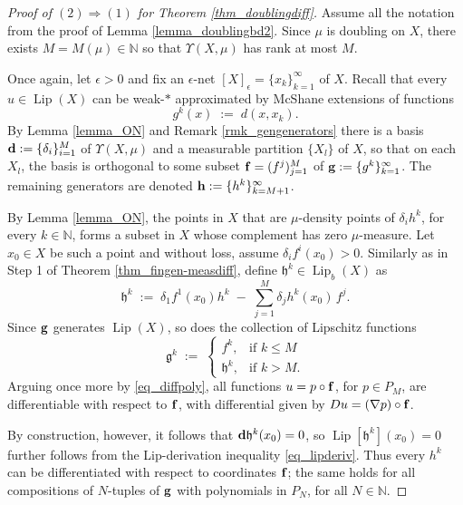 \documentclass[reqno]{amsart}
\theoremstyle{plain}
\theoremstyle{definition}
\theoremstyle{remark}
\numberwithin{equation}{section}
\renewcommand{\d}{\delta}
\newcommand{\e}{\epsilon}
\newcommand{\g}{\mathfrak{g}}
\newcommand{\h}{\mathfrak{h}}
\newcommand{\Lip}{\operatorname{Lip}}
\newcommand{\N}{\mathbb{N}}
\newcommand{\U}{\Upsilon}
\begin{document}
\begin{proof}[Proof of $(2) \Rightarrow (1)$ for Theorem \ref{thm_doublingdiff}]
Assume all the notation from the proof of Lemma \ref{lemma_doublingbd2}.  Since $\mu$ is doubling on $X$, there exists $M = M(\mu) \in \N$ so that $\U(X,\mu)$ has rank at most $M$.

Once again, let $\e > 0$ and fix an $\e$-net $[X]_\e = \{x_k\}_{k=1}^\infty$ of $X$.
Recall that every $u \in \Lip(X)$ can be weak-$*$ approximated by McShane extensions of functions
$$
g^k(x) \;:=\; d(x,x_k).
$$
By Lemma \ref{lemma_ON} and Remark \ref{rmk_gengenerators} there is a basis ${\bf d} := \{\d_i\}_{i=1}^M$ of $\U(X,\mu)$ and a measurable partition $\{X_l\}$ of $X$, so that on each $X_l$, the basis is orthogonal to some subset ${\bf f} = (f^j)_{j=1}^M$ of ${\bf g} := \{g^k\}_{k=1}^\infty$.  The remaining generators are denoted ${\bf h} := \{h^k\}_{k=M+1}^\infty$.

By Lemma \ref{lemma_ON}, the points in $X$ that are $\mu$-density points of $\d_ih^k$, for every $k \in \N$, 
forms a subset in $X$ whose complement has zero $\mu$-measure.
Let $x_0 \in X$ be such a point and without loss, assume $\d_if^i(x_0) > 0$.  Similarly as in Step 1 of Theorem \ref{thm_fingen-measdiff}, define $\h^k \in \Lip_b(X)$ as
$$
\h^k \;:=\; \d_1f^1(x_0) h^k \;-\; \sum_{j=1}^M \d_jh^k(x_0) \, f^j.
$$
Since ${\bf g}$ generates $\Lip(X)$, so does the collection of Lipschitz functions
$$
\g^k \;:=\;
\begin{cases}
f^k, & \text{if } k \leq M \\
\h^k, & \text{if } k > M.
\end{cases}
$$
Arguing once more by \eqref{eq_diffpoly}, all functions $u = p \circ {\bf f}$, for $p \in P_M$, are differentiable with respect to ${\bf f}$, with differential given by $Du = (\nabla p) \circ {\bf f}$.

By construction, however, it follows that ${\bf d}\h^k(x_0) = 0$, so $\Lip[\h^k](x_0) = 0$ further follows from the Lip-derivation inequality \eqref{eq_lipderiv}.  Thus every $h^k$ can be differentiated with respect to coordinates ${\bf f}$; the same holds for all compositions of $N$-tuples of ${\bf g}$ with polynomials in $P_N$, for all $N \in \N$.


\end{proof}
\end{document}
